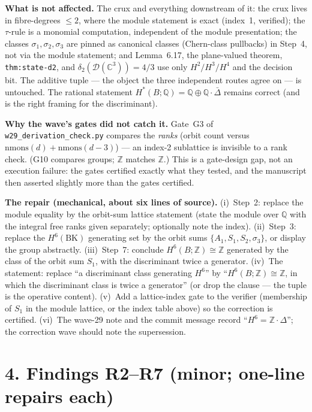 \documentclass[11pt,a4paper]{article}
\newcommand{\Z}{\mathbb{Z}}
\newcommand{\Q}{\mathbb{Q}}
\newcommand{\C}{\mathbb{C}}
\newcommand{\BK}{\mathrm{BK}}
\begin{document}
\textbf{What is not affected.} The crux and everything downstream of it: the
crux lives in fibre-degrees $\le2$, where the module statement is exact
(index~1, verified); the $\tau$-rule is a monomial computation, independent
of the module presentation; the classes $\sigma_1,\sigma_2,\sigma_3$ are
pinned as canonical classes (Chern-class pullbacks) in Step~4, not via the
module statement; and Lemma~6.17, the plane-valued theorem,
\texttt{thm:state-d2}, and $\delta_2(\mathcal D(\C^3))=4/3$ use only
$H^2/H^3/H^4$ and the decision bit. The additive tuple --- the object the
three independent routes agree on --- is untouched. The rational statement
$H^*(B;\Q)=\Q\oplus\Q\cdot\bar\Delta$ remains correct (and is the right
framing for the discriminant).

\textbf{Why the wave's gates did not catch it.} Gate~G3 of
\texttt{w29\_derivation\_check.py} compares the \emph{ranks} (orbit count
versus $\mathrm{nmons}(d)+\mathrm{nmons}(d-3)$) --- an index-2 sublattice is
invisible to a rank check. (G10 compares groups; $\Z$ matches $\Z$.) This is
a gate-design gap, not an execution failure: the gates certified exactly what
they tested, and the manuscript then asserted slightly more than the gates
certified.

\textbf{The repair (mechanical, about six lines of source).}
(i)~Step~2: replace the module equality by the orbit-sum lattice statement
(state the module over $\Q$ with the integral free ranks given separately;
optionally note the index). (ii)~Step~3: replace the $H^6(\BK)$ generating
set by the orbit sums $\{A_1,S_1,S_2,\sigma_3\}$, or display the group
abstractly. (iii)~Step~7: conclude $H^6(B;\Z)\cong\Z$ generated by the
class of the orbit sum $S_1$, with the discriminant twice a generator.
(iv)~The statement: replace ``a discriminant class generating $H^6$'' by
``$H^6(B;\Z)\cong\Z$, in which the discriminant class is twice a generator''
(or drop the clause --- the tuple is the operative content).
(v)~Add a lattice-index gate to the verifier (membership of $S_1$ in the
module lattice, or the index table above) so the correction is certified.
(vi)~The wave-29 note and the commit message record ``$H^6=\Z\cdot\Delta$'';
the correction wave should note the supersession.

\section*{4. Findings R2--R7 (minor; one-line repairs each)}
\end{document}
